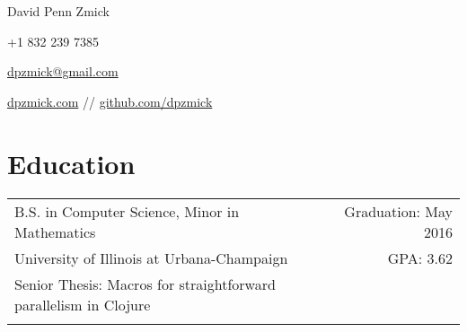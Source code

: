 \documentclass[letterpaper,10pt]{article}
\newcommand{\tbl}{3cm}
\newcommand{\tbr}{12.5cm}
\begin{document}
\begin{center}
    {\Large David Penn Zmick}

    +1 832 239 7385

    \href{mailto:dpzmick@gmail.com}{dpzmick@gmail.com}

    \href{http://dpzmick.com}{dpzmick.com} // \href{http://github.com/dpzmick}{github.com/dpzmick}

\end{center}


\section{Education}
\begin{tabular}{p{12.3cm}r}
    B.S. in Computer Science, Minor in Mathematics & Graduation: May 2016\\
    University of Illinois at Urbana-Champaign     & GPA: 3.62\\
    Senior Thesis: Macros for straightforward parallelism in Clojure\\
    \\
\end{tabular}




\end{document}
